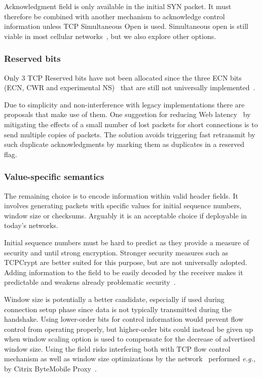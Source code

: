 \documentclass{sig-alternate-10pt}
\providecommand{\eg}{\emph{e.g.,} }
\begin{document}
Acknowledgment field is only available in the initial SYN packet. It must therefore be combined with another mechanism to acknowledge control information unless TCP Simultaneous Open is used. Simultaneous open is still viable in most cellular networks~\cite{UntoldMiddlebox2011}, but we also explore other options.

\subsubsection*{Reserved bits}

Only 3 TCP Reserved bits have not been allocated since the three ECN bits (ECN, CWR and experimental NS)~\cite{Floyd:up,Ely:uc} that are still not universally implemented~\cite{Kuhlewind:2013hr}.

Due to simplicity and non-interference with legacy implementations there are proposals that make use of them. One suggestion for reducing Web latency~\cite{Flach:2013uy} by mitigating the effects of a small number of lost packets for short connections is to send multiple copies of packets. The solution avoids triggering fast retransmit by such duplicate acknowledgments by marking them as duplicates in a reserved flag.

\subsubsection*{Value-specific semantics}

The remaining choice is to encode information within valid header fields. It involves generating packets with specific values for initial sequence numbers, window size or checksums. Arguably it is an acceptable choice if deployable in today's networks.

Initial sequence numbers must be hard to predict as they provide a measure of security and until strong encryption. Stronger security measures such as TCPCrypt are better suited for this purpose, but are not universally adopted. Adding information to the field to be easily decoded by the receiver makes it predictable and weakens already problematic security~\cite{Qian:2012bj,Bellovin:uz,Qian:2012wb}. 

Window size is potentially a better candidate, especially if used during connection setup phase since data is not typically transmitted during the handshake. Using lower-order bits for control information would prevent flow control from operating properly, but higher-order bits could instead be given up when window scaling option is used to compensate for the decrease of advertised window size. Using the field risks interfering both with TCP flow control mechanism as well as window size optimizations by the network~\cite{Kopparty:2002ht,Chakravorty:2003dm} performed \eg by Citrix ByteMobile Proxy~\cite{Ha:2006td}. 
\end{document}
